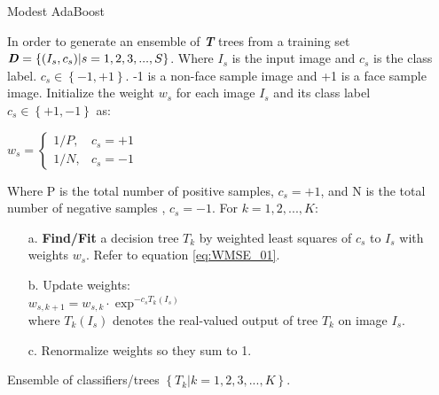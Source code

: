 \documentclass[a4paper,12pt]{article}
\begin{document}
\begin{algorithm}[htb]
  \caption{ Modest AdaBoost}\cite{GML327}
  \label{alg:ModestAdaBoost}
  \begin{algorithmic}[1]
    \Require
	In order to generate an ensemble of \textbf{\textit{T}} trees from a training set 	$\textbf{\textit{D}}=\left\{ { (I_s,c_s) | s=1,2,3,...,S}\right\}$. Where $I_s$ is the input image and $c_s$ is the class label. $c_s \in \left\{{-1,+1 } \right\}$. -1 is a non-face sample image and +1 is a face sample image.
    \State Initialize the weight $w_s$ for each image $I_s$ and its class label $c_s \in
    	\left\{ {+1,-1}\right\}$ as:

    $w_s=
	\begin{cases}
    1/P,	& c_s = +1 \\
    1/N,    & c_s = -1
	\end{cases}$

		Where P is the total number of positive samples, $c_s=+1$, and N is the total number of negative samples , 			$c_s=-1$.
    \State For $k = 1,2,...,K:$
    \begin{itemize}
	\item[a.]{\textbf{Find/Fit} a decision tree $T_k$ by weighted least squares of $c_s$ to $I_s$ with
	weights $w_s$}. Refer to equation \eqref{eq:WMSE_01}.
	\item[b.]{Update weights:}\\
		$w_{s,k+1} = w_{s,k} \cdot \exp^{-c_s T_k(I_s)}$\\
		where $T_k(I_s)$ denotes the real-valued output of tree $T_k$ on image $I_s$.
	\item[c.]{Renormalize weights so they sum to 1.}
	\end{itemize}
    \Ensure
      Ensemble of classifiers/trees $\left\{ { T_k | k=1,2,3,...,K}\right\}$.
  \end{algorithmic}
\end{algorithm}
\end{document}
